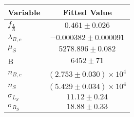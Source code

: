 \begin{tabular}[t]{lc}
\hline
Variable &Fitted Value\\
\hline\hline
$f_{\frac{L}{R}}$&$0.461\pm0.026$\\
\hline
$\lambda_{B,c}$&$-0.000382\pm0.000091$\\
\hline
$\mu_S$&$5278.896\pm0.082$\\
\hline
B&$6452\pm71$\\
\hline
$n_{B,c}$&$(2.753\pm0.030)\times 10^4$\\
\hline
$n_S$&$(5.429\pm0.034)\times 10^4$\\
\hline
$\sigma_{L_S}$&$11.12\pm0.24$\\
\hline
$\sigma_{R_S}$&$18.88\pm0.33$\\
\hline
\end{tabular}